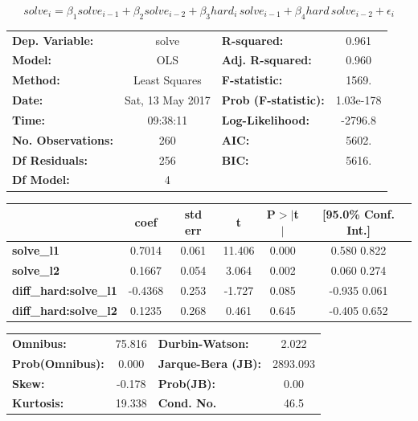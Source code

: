 \documentclass{article}
\begin{document}
\[
solve_i = \beta_1 solve_{i-1} + \beta_2 solve_{i-2} + \beta_3 hard_i \, solve_{i-1} + \beta_4 hard \, solve_{i-2} + \epsilon_i
\]

\begin{center}
\begin{tabular}{lclc}
\toprule
\textbf{Dep. Variable:}     &      solve       & \textbf{  R-squared:         } &     0.961   \\
\textbf{Model:}             &       OLS        & \textbf{  Adj. R-squared:    } &     0.960   \\
\textbf{Method:}            &  Least Squares   & \textbf{  F-statistic:       } &     1569.   \\
\textbf{Date:}              & Sat, 13 May 2017 & \textbf{  Prob (F-statistic):} & 1.03e-178   \\
\textbf{Time:}              &     09:38:11     & \textbf{  Log-Likelihood:    } &   -2796.8   \\
\textbf{No. Observations:}  &         260      & \textbf{  AIC:               } &     5602.   \\
\textbf{Df Residuals:}      &         256      & \textbf{  BIC:               } &     5616.   \\
\textbf{Df Model:}          &           4      & \textbf{                     } &             \\
\bottomrule
\end{tabular}
\begin{tabular}{lccccc}
                            & \textbf{coef} & \textbf{std err} & \textbf{t} & \textbf{P$>$$|$t$|$} & \textbf{[95.0\% Conf. Int.]}  \\
\midrule
\textbf{solve\_l1}           &       0.7014  &        0.061     &    11.406  &         0.000        &         0.580     0.822       \\
\textbf{solve\_l2}           &       0.1667  &        0.054     &     3.064  &         0.002        &         0.060     0.274       \\
\textbf{diff\_hard:solve\_l1} &      -0.4368  &        0.253     &    -1.727  &         0.085        &        -0.935     0.061       \\
\textbf{diff\_hard:solve\_l2} &       0.1235  &        0.268     &     0.461  &         0.645        &        -0.405     0.652       \\
\bottomrule
\end{tabular}
\begin{tabular}{lclc}
\textbf{Omnibus:}       & 75.816 & \textbf{  Durbin-Watson:     } &    2.022  \\
\textbf{Prob(Omnibus):} &  0.000 & \textbf{  Jarque-Bera (JB):  } & 2893.093  \\
\textbf{Skew:}          & -0.178 & \textbf{  Prob(JB):          } &     0.00  \\
\textbf{Kurtosis:}      & 19.338 & \textbf{  Cond. No.          } &     46.5  \\
\bottomrule
\end{tabular}
\end{center}
\end{document}
